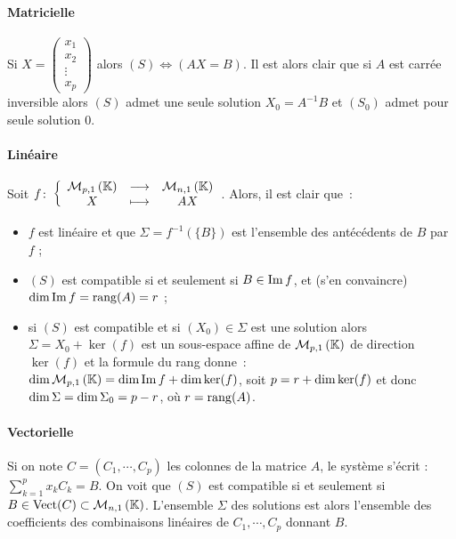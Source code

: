 \paragraph{Matricielle}
Si $X = \begin{pmatrix} x_1 \\ x_2 \\ \vdots \\ x_p \end{pmatrix}$ alors $(S) \iff (AX =B)$. Il est alors clair que si $A$ est carrée inversible alors $(S)$ admet une seule solution $X_0 = A^{-1}B$ et $(S_0)$ admet pour seule solution $0$.

\paragraph{Linéaire}
Soit $f\colon \left\{\begin{array}{ccc} \mathcal{M}_{p,1}\left(\mathbb{K}\right) & \longrightarrow &\mathcal{M}_{n,1}\left(\mathbb{K}\right)\\ X & \longmapsto & AX \end{array} \right.$. Alors, il est clair que~:
\begin{itemize}
	\item $f$ est linéaire et que $\Sigma = f^{-1}(\{B\})$ est l'ensemble des antécédents de $B$ par $f$ ;
	\item $(S)$ est compatible si et seulement si $B \in \operatorname{Im}{f}$, et (s'en convaincre) $\operatorname{dim} \operatorname{Im}{f} = \operatorname{rang}(A) = r$ ;
	\item si $(S)$ est compatible et si $(X_0) \in \Sigma$ est une solution alors $\Sigma = X_0+ \ker(f)$ est un sous-espace affine de $\mathcal{M}_{p,1}\left(\mathbb{K}\right)$ de direction $\ker(f)$ et la formule du rang donne~: $\operatorname{dim} \mathcal{M}_{p,1}\left(\mathbb{K}\right) = \operatorname{dim} \operatorname{Im}{f} + \operatorname{dim} \ker(f)$, soit $p=r+\operatorname{dim} \ker(f)$ et donc $\operatorname{dim} \Sigma = \operatorname{dim} \Sigma_0 = p-r$, où $r=\operatorname{rang}(A)$.
\end{itemize}

\paragraph{Vectorielle} Si on note $C=(C_1, \cdots, C_p)$ les colonnes de la matrice $A$, le système s'écrit : $\sum_{k=1}^p x_kC_k = B$. On voit que $(S)$ est compatible si et seulement si $B \in \operatorname{Vect}(C) \subset \mathcal{M}_{n,1}\left(\mathbb{K}\right)$. L'ensemble $\Sigma$ des solutions est alors l'ensemble des coefficients des combinaisons linéaires de $C_1, \cdots, C_p$ donnant $B$.

